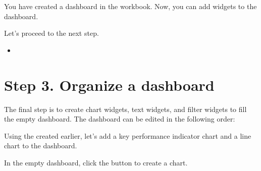 \documentclass[letterpaper,10pt,english]{sphinxmanual}
\begin{document}
You have created a dashboard in the workbook. Now, you can add widgets to the dashboard.
\begin{quote}

\begin{figure}[H]
\centering

\noindent{}
\end{figure}
\end{quote}

Let’s proceed to the next step.
\begin{itemize}
\item {} 
{\hyperref[\detokenize{discovery/part00/step3::doc}]{}}

\end{itemize}


\section{Step 3. Organize a dashboard}
\label{\detokenize{discovery/part00/step3:step3}}\label{\detokenize{discovery/part00/step3::doc}}
The final step is to create chart widgets, text widgets, and filter widgets to fill the empty dashboard. The dashboard can be edited in the following order:
\begin{quote}

\begin{figure}[H]
\centering

\noindent{}
\end{figure}
\end{quote}

Using the  created earlier, let’s add a key performance indicator chart and a line chart to the dashboard.
\begin{quote}

\begin{figure}[H]
\centering

\noindent{}
\end{figure}
\end{quote}

In the empty dashboard, click the  button to create a chart.
\begin{quote}

\begin{figure}[H]
\centering

\noindent{}
\end{figure}
\end{quote}
\end{document}
